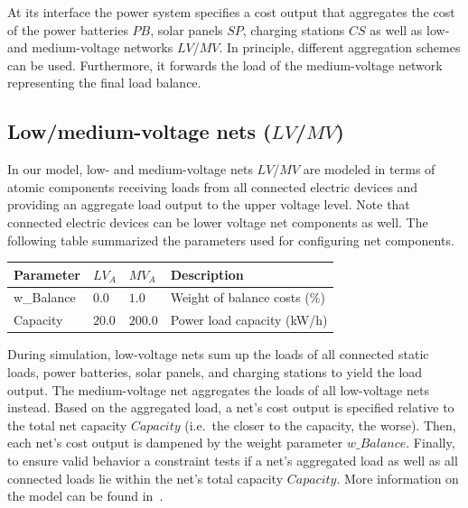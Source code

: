 At its interface the power system specifies a cost output that aggregates the cost of the power batteries $PB$, solar panels $SP$, charging stations $CS$ as well as low- and medium-voltage networks $LV$/$MV$. In principle, different aggregation schemes can be used. Furthermore, it forwards the load of the medium-voltage network representing the final load balance.

\subsection{Low/medium-voltage nets ($LV$/$MV$)}

In our model, low- and medium-voltage nets $LV$/$MV$ are modeled in terms of atomic components receiving loads from all connected electric devices and providing an aggregate load output to the upper voltage level. Note that connected electric devices can be lower voltage net components as well. The following table summarized the parameters used for configuring net components.

\begin{table}[h]
	\renewcommand{\arraystretch}{1.3}
	\centering
	\begin{tabularx}{\columnwidth}{lllX}
		\hline
		\textbf{Parameter}   & \textbf{$LV_{A}$} & \textbf{$MV_{A}$}  & Description \\ \hline
		w\_Balance       & $0.0$ & $1.0$ & Weight of balance costs (\%) \\  
		Capacity          & $20.0$ & $200.0$ & Power load capacity (kW/h)     \\ \hline
	\end{tabularx}
\end{table}

During simulation, low-voltage nets sum up the loads of all connected static loads, power batteries, solar panels, and charging stations to yield the load output. The medium-voltage net aggregates the loads of all low-voltage nets instead. Based on the aggregated load, a net's cost output is specified relative to the total net capacity $Capacity$ (i.e.\ the closer to the capacity, the worse). Then, each net's cost output is dampened by the weight parameter $w\_Balance$. Finally, to ensure valid behavior a constraint tests if a net's aggregated load as well as all connected loads lie within the net's total capacity $Capacity$. More information on the model can be found in~\cite{hackenberg2012applying}.

